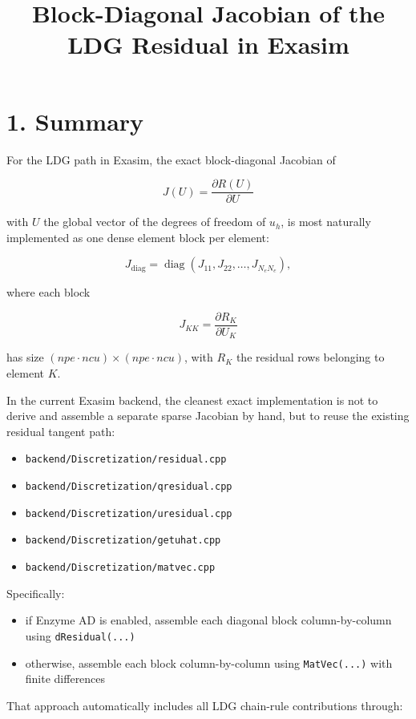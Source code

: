 \documentclass[11pt]{article}
\title{Block-Diagonal Jacobian of the LDG Residual in Exasim}
\author{}
\date{}
\begin{document}
\maketitle

\section*{1. Summary}

For the LDG path in Exasim, the exact block-diagonal Jacobian of

\[
J(U) = \frac{\partial R(U)}{\partial U}
\]

with $U$ the global vector of the degrees of freedom of $u_h$, is most
naturally implemented as one dense element block per element:

\[
J_{\mathrm{diag}} = \operatorname{diag}(J_{11}, J_{22}, \dots, J_{N_e N_e}),
\]

where each block

\[
J_{KK} = \frac{\partial R_K}{\partial U_K}
\]

has size $(npe \cdot ncu) \times (npe \cdot ncu)$, with $R_K$ the residual
rows belonging to element $K$.

In the current Exasim backend, the cleanest exact implementation is not to
derive and assemble a separate sparse Jacobian by hand, but to reuse the
existing residual tangent path:

\begin{itemize}[leftmargin=*]
\item \texttt{backend/Discretization/residual.cpp}
\item \texttt{backend/Discretization/qresidual.cpp}
\item \texttt{backend/Discretization/uresidual.cpp}
\item \texttt{backend/Discretization/getuhat.cpp}
\item \texttt{backend/Discretization/matvec.cpp}
\end{itemize}

Specifically:

\begin{itemize}[leftmargin=*]
\item if Enzyme AD is enabled, assemble each diagonal block column-by-column
using \texttt{dResidual(...)}
\item otherwise, assemble each block column-by-column using
\texttt{MatVec(...)} with finite differences
\end{itemize}

That approach automatically includes all LDG chain-rule contributions through:
\end{document}
